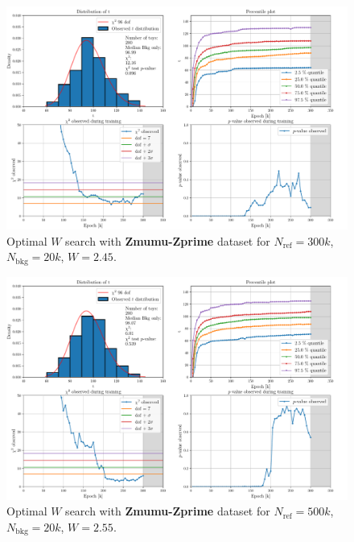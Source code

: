 \vspace{-5mm}
\begin{figure}[H]
	\centering
	\includegraphics[width=1.0\textwidth]{Python/W_CLIP/ref300000_bkg20000_sig0/data_ref300000_bkg20000_sig0_wclip2-45.pdf}
	\caption{Optimal $W$ search with \textbf{Zmumu-Zprime} dataset for $N_\mathrm{ref}=300\si{k}$, $N_\mathrm{bkg}=20\si{k}$, $W=2.45$.}
	\label{fig:REF300000_BKG20000_SIG0_WCLIP2.45}
\end{figure}
\vspace{-5mm}
\begin{figure}[H]
	\centering
	\includegraphics[width=1.0\textwidth]{Python/W_CLIP/ref500000_bkg20000_sig0/data_ref500000_bkg20000_sig0_wclip2-55.pdf}
	\caption{Optimal $W$ search with \textbf{Zmumu-Zprime} dataset for $N_\mathrm{ref}=500\si{k}$, $N_\mathrm{bkg}=20\si{k}$, $W=2.55$.}
	\label{fig:REF500000_BKG20000_SIG0_WCLIP2.55}
\end{figure}

